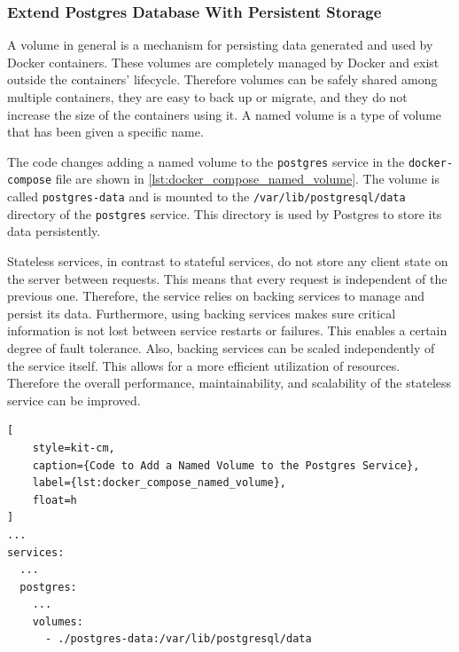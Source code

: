\subsubsection*{Extend Postgres Database With Persistent Storage}
A volume in general is a mechanism for persisting data generated and used by Docker containers.
These volumes are completely managed by Docker and exist outside the containers' lifecycle.
Therefore volumes can be safely shared among multiple containers, they are easy to back up or migrate, and they do not increase the size of the containers using it.
A named volume is a type of volume that has been given a specific name.

The code changes adding a named volume to the \texttt{postgres} service in the \texttt{docker-compose} file are shown in \autoref*{lst:docker_compose_named_volume}.
The volume is called \texttt{postgres-data} and is mounted to the \texttt{/var/lib/postgresql/data} directory of the \texttt{postgres} service.
This directory is used by Postgres to store its data persistently.

Stateless services, in contrast to stateful services, do not store any client state on the server between requests.
This means that every request is independent of the previous one.
Therefore, the service relies on backing services to manage and persist its data.
Furthermore, using backing services makes sure critical information is not lost between service restarts or failures.
This enables a certain degree of fault tolerance.
Also, backing services can be scaled independently of the service itself.
This allows for a more efficient utilization of resources.
Therefore the overall performance, maintainability, and scalability of the stateless service can be improved.

\begin{lstlisting}[
    style=kit-cm,
    caption={Code to Add a Named Volume to the Postgres Service},
    label={lst:docker_compose_named_volume},
    float=h
]
...
services:
  ...
  postgres:
    ...
    volumes:
      - ./postgres-data:/var/lib/postgresql/data
\end{lstlisting}